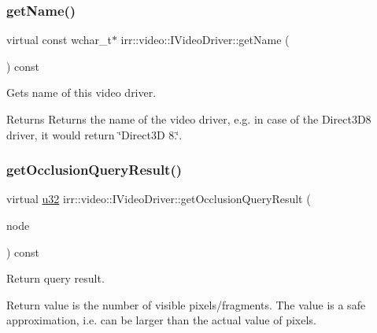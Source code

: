 \subsubsection{\texorpdfstring{get\+Name()}{getName()}\hspace{0.1cm}{\footnotesize\ttfamily [2/2]}}
{\footnotesize\ttfamily virtual const wchar\+\_\+t$\ast$ irr\+::video\+::\+I\+Video\+Driver\+::get\+Name (\begin{DoxyParamCaption}{ }\end{DoxyParamCaption}) const\hspace{0.3cm}{\ttfamily [pure virtual]}}



Gets name of this video driver. 

\begin{DoxyReturn}{Returns}
Returns the name of the video driver, e.\+g. in case of the Direct3\+D8 driver, it would return \char`\"{}\+Direct3\+D 8.\char`\"{}. 
\end{DoxyReturn}
\mbox{\label{classirr_1_1video_1_1IVideoDriver_a149ea92e04b2d0fe18bf5b584ccf6de4}} 
\subsubsection{\texorpdfstring{get\+Occlusion\+Query\+Result()}{getOcclusionQueryResult()}\hspace{0.1cm}{\footnotesize\ttfamily [1/2]}}
{\footnotesize\ttfamily virtual \hyperlink{namespaceirr_a0416a53257075833e7002efd0a18e804}{u32} irr\+::video\+::\+I\+Video\+Driver\+::get\+Occlusion\+Query\+Result (\begin{DoxyParamCaption}\item[{\hyperlink{classirr_1_1scene_1_1ISceneNode}{scene\+::\+I\+Scene\+Node} $\ast$}]{node }\end{DoxyParamCaption}) const\hspace{0.3cm}{\ttfamily [pure virtual]}}



Return query result. 

Return value is the number of visible pixels/fragments. The value is a safe approximation, i.\+e. can be larger than the actual value of pixels. \mbox{\label{classirr_1_1video_1_1IVideoDriver_a149ea92e04b2d0fe18bf5b584ccf6de4}} 
